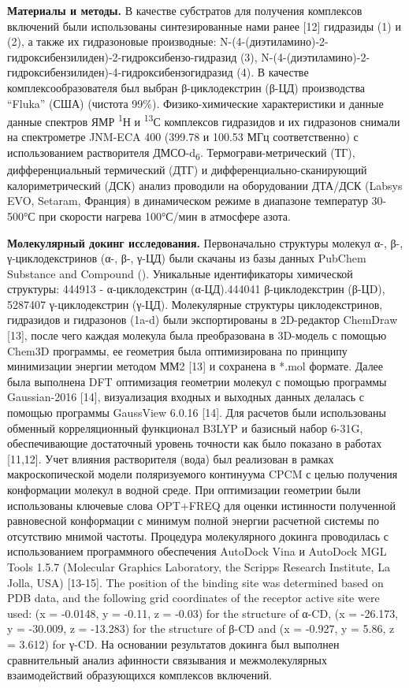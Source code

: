 \begin{multicols}{2}
{\bfseries Материалы и методы.} В качестве субстратов для получения
комплексов включений были использованы синтезированные нами ранее
{[}12{]} гидразиды (1) и (2), а также их гидразоновые производные:
N-(4-(диэтиламино)-2-гидроксибензилиден)-2-гидроксибензо-гидразид (3),
N-(4-(диэтиламино)-2-гидроксибензилиден)-4-гидроксибензогидразид (4). В
качестве комплексообразователя был выбран β-циклодекстрин (β-ЦД)
производства ``Fluka'' (США) (чистота 99\%). Физико-химические
характеристики и данные данные спектров ЯМР \textsuperscript{1}Н и
\textsuperscript{13}С комплексов гидразидов и их гидразонов снимали на
спектрометре JNM-ECA 400 (399.78 и 100.53 МГц соответственно) с
использованием растворителя ДМСО-d\textsubscript{6}.
Термограви-метрический (ТГ), дифференциальный термический (ДТГ) и
дифференциально-сканирующий калориметрический (ДСК) анализ проводили на
оборудовании ДТА/ДСК (Labsys EVO, Setaram, Франция) в динамическом
режиме в диапазоне температур 30-500°С при скорости нагрева 100°С/мин в
атмосфере азота.

{\bfseries Молекулярный докинг исследования.} Первоначально структуры
молекул α-, β-, γ-циклодекстринов (α-, β-, γ-ЦД) были скачаны из базы
данных PubChem Substance and Compound
(\href{https://pubchem.ncbi.nlm.nih.gov/}{}).
Уникальные идентификаторы химической структуры: 444913 - α-циклодекстрин
(α-ЦД).444041 β-циклодекстрин (β-ЦD), 5287407 γ-циклодекстрин (γ-ЦД).
Молекулярные структуры циклодекстринов, гидразидов и гидразонов (1a-d)
были экспортированы в 2D-редактор ChemDraw {[}13{]}, после чего каждая
молекула была преобразована в 3D-модель с помощью Chem3D программы, ее
геометрия была оптимизирована по принципу минимизации энергии методом
ММ2 {[}13{]} и сохранена в *.mol формате. Далее была выполнена DFT
оптимизация геометрии молекул с помощью программы Gaussian-2016
{[}14{]}, визуализация входных и выходных данных делалась с помощью
программы GaussView 6.0.16 {[}14{]}. Для расчетов были использованы
обменный корреляционный функционал B3LYP и базисный набор 6-31G,
обеспечивающие достаточный уровень точности как было показано в работах
{[}11,12{]}. Учет влияния растворителя (вода) был реализован в рамках
макроскопической модели поляризуемого континуума CPCM с целью получения
конформации молекул в водной среде. При оптимизации геометрии были
использованы ключевые слова OPT+FREQ для оценки истинности полученной
равновесной конформации с минимум полной энергии расчетной системы по
отсутствию мнимой частоты. Процедура молекулярного докинга проводилась с
использованием программного обеспечения AutoDock Vina и AutoDock MGL
Tools 1.5.7 (Molecular Graphics Laboratory, the Scripps Research
Institute, La Jolla, USA) {[}13-15{]}. The position of the binding site
was determined based on PDB data, and the following grid coordinates of
the receptor active site were used: (x = -0.0148, y = -0.11, z = -0.03)
for the structure of α-CD, (x = -26.173, y = -30.009, z = -13.283) for
the structure of β-CD and (x = -0.927, y = 5.86, z = 3.612) for γ-CD. На
основании результатов докинга был выполнен сравнительный анализ
афинности связывания и межмолекулярных взаимодействий образующихся
комплексов включений.


\end{multicols}
